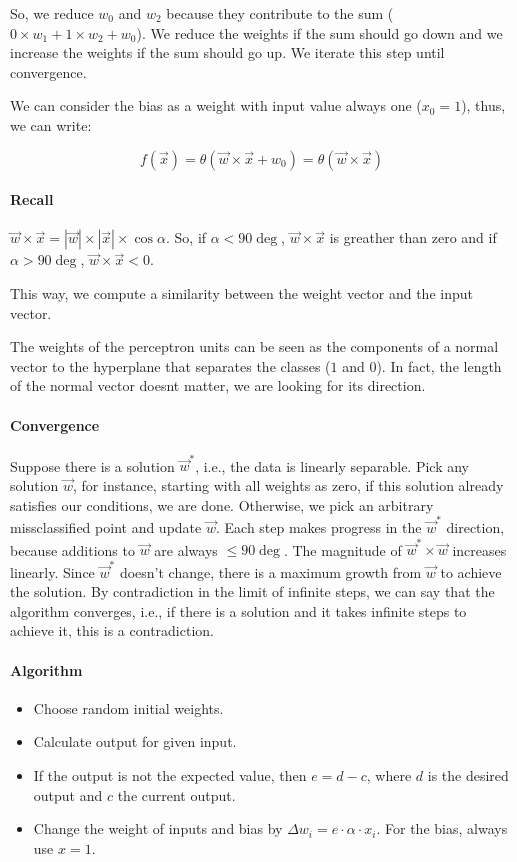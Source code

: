 \documentclass[main]{subfiles}
\begin{document}
So, we reduce $w_0$ and $w_2$ because they contribute to the sum ($0 \times w_1 + 1 \times w_2 + w_0$).
We reduce the weights if the sum should go down and we increase the weights if the sum should go up. We iterate this step until convergence.

We can consider the bias as a weight with input value always one ($x_0 = 1$), thus, we can write:

\[ f(\vec{x}) = \theta(\vec{w} \times \vec{x} + w_0) = \theta(\vec{w} \times \vec{x}) \]

\paragraph{Recall} $\vec{w} \times \vec{x} = |\vec{w}| \times |\vec{x}| \times \cos \alpha$.
So, if $\alpha < 90\deg$, $\vec{w} \times \vec{x}$ is greather than zero and if $\alpha > 90\deg$, $\vec{w} \times \vec{x} < 0$.

This way, we compute a similarity between the weight vector and the input vector.

The weights of the perceptron units can be seen as the components of a normal vector to the hyperplane that separates the classes ($1$ and $0$).
In  fact, the  length of the normal vector doesnt matter, we are looking for its direction.

\paragraph{Convergence}
Suppose there is a solution $\vec{w}^*$, i.e., the data is linearly separable.
Pick any solution $\vec{w}$, for instance, starting with all weights as zero, if this solution already satisfies our conditions, we are done.
Otherwise, we pick an arbitrary missclassified point and update $\vec{w}$.
Each step makes progress in the $\vec{w}^*$ direction, because additions to $\vec{w}$ are always $\leq 90\deg$.
The magnitude of $\vec{w}^* \times \vec{w}$ increases linearly.
Since $\vec{w}^*$ doesn't change, there is a maximum growth from $\vec{w}$ to achieve the solution.
By contradiction in the limit of infinite steps, we can say that the algorithm converges, i.e., if there is a solution and it takes infinite steps to achieve it, this is a contradiction.

\paragraph{Algorithm}
\begin{itemize}[noitemsep,nolistsep]
	\item Choose random initial weights.
	\item Calculate output for given input.
	\item If the output is not the expected value, then $e=d-c$, where $d$ is the desired output and $c$ the current output.
	\item Change the weight of inputs and bias by $\Delta w_i=e\cdot\alpha\cdot x_i$. For the bias, always use $x=1$.
\end{itemize}
\end{document}
